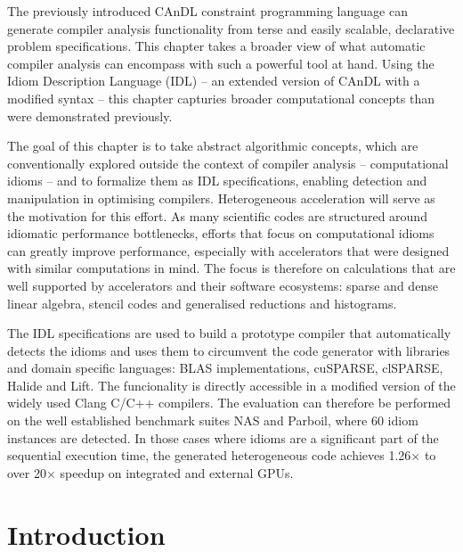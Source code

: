
    The previously introduced CAnDL constraint programming language can generate
    compiler analysis functionality from terse and easily scalable, declarative
    problem specifications.
    This chapter takes a broader view of what automatic compiler analysis can
    encompass with such a powerful tool at hand.
    Using the Idiom Description Language (IDL) -- an extended version of CAnDL
    with a modified syntax -- this chapter capturies broader computational
    concepts than were demonstrated previously.

    The goal of this chapter is to take abstract algorithmic concepts, which are
    conventionally explored outside the context of compiler analysis --
    computational idioms -- and to formalize them as IDL specifications,
    enabling detection and manipulation in optimising compilers.
    Heterogeneous acceleration will serve as the motivation for this effort.
    As many scientific codes are structured around idiomatic performance
    bottlenecks, efforts that focus on computational idioms can greatly
    improve performance, especially with accelerators that were designed
    with similar computations in mind.
    The focus is therefore on calculations that are well supported by
    accelerators and their software ecosystems: sparse and dense linear algebra,
    stencil codes and generalised reductions and histograms.

    The IDL specifications are used to build a prototype compiler that
    automatically detects the idioms and uses them to circumvent the code
    generator with libraries and domain specific languages:
    BLAS implementations, cuSPARSE, clSPARSE, Halide and Lift.
    The funcionality is directly accessible in a modified version of the widely
    used Clang C/C++ compilers.
    The evaluation can therefore be performed on the well established benchmark
    suites NAS and Parboil, where 60 idiom instances are detected.
    In those cases where idioms are a significant part of the sequential
    execution time, the generated heterogeneous code achieves 1.26$\times$ to
    over 20$\times$ speedup on integrated and external GPUs.

\section{Introduction}

